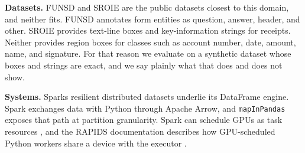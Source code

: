 \textbf{Datasets.} FUNSD \cite{jaume2019} and SROIE \cite{huang2019sroie} are the public datasets closest to this domain, and neither fits. FUNSD annotates form entities as question, answer, header, and other. SROIE provides text-line boxes and key-information strings for receipts. Neither provides region boxes for classes such as account number, date, amount, name, and signature. For that reason we evaluate on a synthetic dataset whose boxes and strings are exact, and we say plainly what that does and does not show.

\textbf{Systems.} Spark\textquotesingle{}s resilient distributed datasets \cite{zaharia2012} underlie its DataFrame engine. Spark exchanges data with Python through Apache Arrow, and \texttt{mapInPandas} \cite{spark_mapinpandas} exposes that path at partition granularity. Spark can schedule GPUs as task resources \cite{spark_resources}, and the RAPIDS documentation describes how GPU-scheduled Python workers share a device with the executor \cite{nvidia_udf}.
